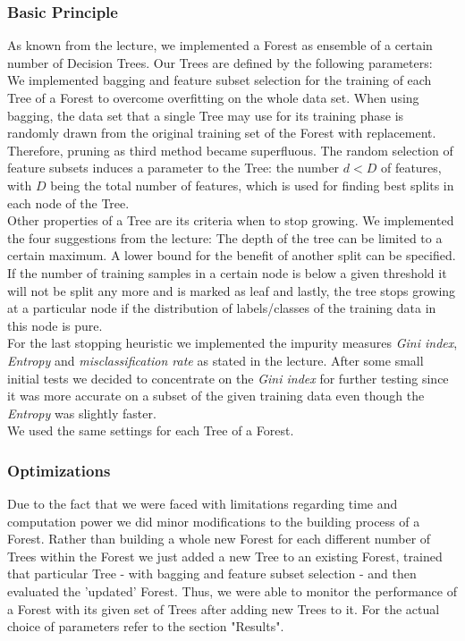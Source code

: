 \documentclass[twocolumn]{article}
\begin{document}
\subsubsection{Basic Principle}
As known from the lecture, we implemented a Forest as ensemble of a certain number of Decision Trees. Our Trees are defined by the following parameters:\\
We implemented bagging and feature subset selection for the training of each Tree of a Forest to overcome overfitting on the whole data set. When using bagging, the data set that a single Tree may use for its training phase is randomly drawn from the original training set of the Forest with replacement. Therefore, pruning as third method became superfluous. The random selection of feature subsets induces a parameter to the Tree: the number $d<D$ of features, with $D$ being the total number of features, which is used for finding best splits in each node of the Tree.\\
Other properties of a Tree are its criteria when to stop growing. We implemented the four suggestions from the lecture: The depth of the tree can be limited to a certain maximum. A lower bound for the benefit of another split can be specified. If the number of training samples in a certain node is below a given threshold it will not be split any more and is marked as leaf and lastly, the tree stops growing at a particular node if the distribution of labels/classes of the training data in this node is pure.\\
For the last stopping heuristic we implemented the impurity measures \textit{Gini index}, \textit{Entropy} and \textit{misclassification rate} as stated in the lecture. After some small initial tests we decided to concentrate on the \textit{Gini index} for further testing since it was more accurate on a subset of the given training data even though the \textit{Entropy} was slightly faster.\\
We used the same settings for each Tree of a Forest.

\subsubsection{Optimizations}
Due to the fact that we were faced with limitations regarding time and computation power we did minor modifications to the building process of a Forest. Rather than building a whole new Forest for each different number of Trees within the Forest we just added a new Tree to an existing Forest, trained that particular Tree - with bagging and feature subset selection - and then evaluated the 'updated' Forest. Thus, we were able to monitor the performance of a Forest with its given set of Trees after adding new Trees to it. For the actual choice of parameters refer to the section "Results".
\end{document}
